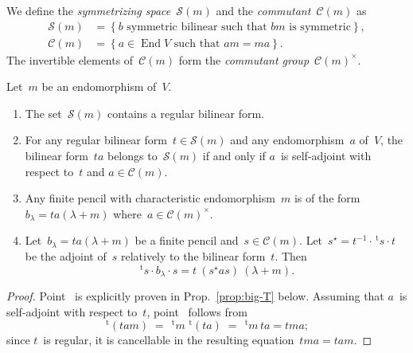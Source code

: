 \documentclass{lms}%
\let\ro\mathscr
\def\transpose{\,{}^{\mathrm{t}\!}}
\def\acco#1{\left\{#1\right\}}
\DeclareMathOperator\End{End}
\begin{document}
We define the \emph{symmetrizing
space}~$\ro S(m)$ and the \emph{commutant}~$\ro C(m)$ as
\begin{equation}\begin{split}
\ro S(m) &= \acco{\text{$b$ symmetric bilinear such that $bm$~is symmetric} },\\
\ro C(m) &= \acco{\text{$a ∈ \End V$ such that~$am = ma$}}.
\end{split}\end{equation}
The invertible elements of~$\ro C(m)$ form the \emph{commutant
group}~$\ro C(m)^{×}$.

\begin{prop}\label{prop:structure-sym}
Let~$m$ be an endomorphism of~$V$.
\begin{enumerate}
\item \label{it:sym-inv} The set~$\ro S(m)$ contains a regular bilinear
form.
\item \label{it:sym-comm} For any regular bilinear form~$t ∈ \ro S(m)$
and any endomorphism~$a$ of~$V$, the bilinear form~$ta$ belongs to~$\ro
S(m)$ if and only if $a$~is self-adjoint with respect to~$t$ and $a ∈ \ro
C(m)$.
\item Any finite pencil with characteristic endomorphism~$m$ is of the
form $b_{λ} = ta (λ+m)$ where~$a ∈ \ro C(m)^{×}$.
\item Let~$b_{λ} = ta(λ+m)$ be a finite pencil and~$s ∈ \ro C(m)$.
Let~$s^{⋆} = t^{-1} · \transpose{s} · t$ be the adjoint of~$s$
relatively to the bilinear form~$t$. Then
\begin{equation}
\transpose{s} · b_{λ} · s = t\: (s^{⋆} a s)\: (λ + m).
\end{equation}
\end{enumerate}
\end{prop}

\begin{proof}
Point~ is explicitly proven in Prop.~\ref{prop:big-T}
below. Assuming that $a$~is self-adjoint with respect to~$t$,
point~ follows from
\begin{equation}
\transpose{(tam)} \;=\; \transpose{m}\, \transpose{(ta)}
 \;=\; \transpose{m}\,ta = tma;
\end{equation}
since $t$~is regular, it is cancellable in the resulting equation~$tma
= tam$.
\end{proof}
\end{document}
